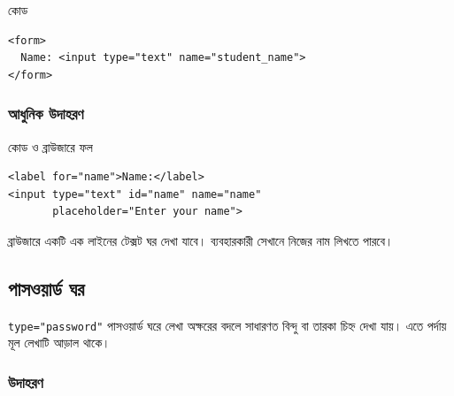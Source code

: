 \begin{examplebox}{কোড}
\par\noindent\begin{minipage}{\linewidth}
\begin{verbatim}
<form>
  Name: <input type="text" name="student_name">
</form>
\end{verbatim}
\end{minipage}\par
\end{examplebox}

\subsubsection{আধুনিক উদাহরণ}

\begin{chFourWholeExample}{কোড ও ব্রাউজারে ফল}
\noindent
\begin{minipage}[t]{.50\linewidth}\vspace{0pt}

\begin{verbatim}
<label for="name">Name:</label>
<input type="text" id="name" name="name"
       placeholder="Enter your name">
\end{verbatim}

\end{minipage}\hfill
\begin{minipage}[t]{.46\linewidth}\vspace{0pt}
ব্রাউজারে একটি এক লাইনের টেক্সট ঘর দেখা যাবে। ব্যবহারকারী সেখানে নিজের নাম লিখতে পারবে।
\end{minipage}

\end{chFourWholeExample}

\subsection{পাসওয়ার্ড ঘর}

\begin{definitionbox}{\texttt{type="password"}}
পাসওয়ার্ড ঘরে লেখা অক্ষরের বদলে সাধারণত বিন্দু বা তারকা চিহ্ন দেখা যায়। এতে পর্দায় মূল লেখাটি আড়াল থাকে।
\end{definitionbox}

\subsubsection{উদাহরণ}

